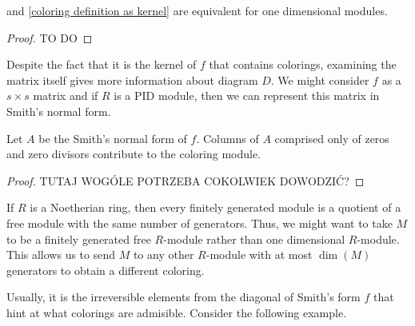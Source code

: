 \begin{corollary}
   and \cref{coloring definition as kernel} are equivalent for one dimensional modules.
\end{corollary}

\begin{proof}
  {\large\color{red}TO DO}
\end{proof}

Despite the fact that it is the kernel of $f$ that contains colorings, examining the matrix itself gives more information about diagram $D$. We might consider $f$ as a $s\times s$ matrix and if $R$ is a PID module, then we can represent this matrix in Smith's normal form. 

\begin{proposition}
  Let $A$ be the Smith's normal form of $f$. Columns of $A$ comprised only of zeros and zero divisors contribute to the coloring module.
\end{proposition}

\begin{proof}
  {\large\color{red}TUTAJ WOGÓLE POTRZEBA COKOLWIEK DOWODZIĆ?}
\end{proof}


If $R$ is a Noetherian ring, then every finitely generated module is a quotient of a free module with the same number of generators. Thus, we might want to take $M$ to be a finitely generated free $R$-module rather than one dimensional $R$-module. This allows us to send $M$ to any other $R$-module with at most $\dim (M)$ generators to obtain a different coloring.

Usually, it is the irreversible elements from the diagonal of Smith's form $f$ that hint at what colorings are admisible. Consider the following example.

